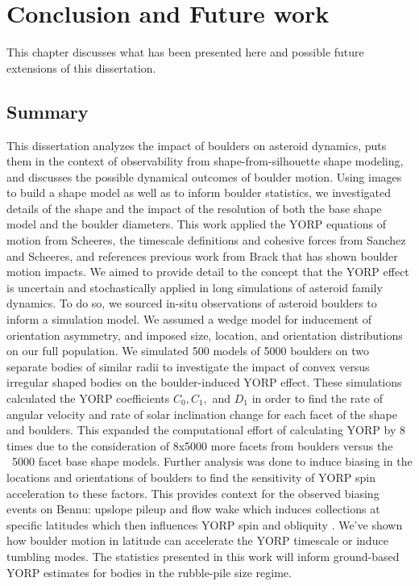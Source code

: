 \chapter{Conclusion and Future work}
\label{future_work}
This chapter discusses what has been presented here and possible future extensions of this dissertation.

\section{Summary}
This dissertation analyzes the impact of boulders on asteroid dynamics, puts them in the context of observability from shape-from-silhouette shape modeling, and discusses the possible dynamical outcomes of boulder motion. Using images to build a shape model as well as to inform boulder statistics, we investigated details of the shape and the impact of the resolution of both the base shape model and the boulder diameters. This work applied the YORP equations of motion from Scheeres, the timescale definitions and cohesive forces from Sanchez and Scheeres, and references previous work from Brack that has shown boulder motion impacts. We aimed to provide detail to the concept that the YORP effect is uncertain and stochastically applied in long simulations of asteroid family dynamics. To do so, we sourced in-situ observations of asteroid boulders to inform a simulation model. We assumed a wedge model for inducement of orientation asymmetry, and imposed size, location, and orientation distributions on our full population. We simulated 500 models of 5000 boulders on two separate bodies of similar radii to investigate the impact of convex versus irregular shaped bodies on the boulder-induced YORP effect. These simulations calculated the YORP coefficients $C_0, C_1,$ and $D_1$ in order to find the rate of angular velocity and rate of solar inclination change for each facet of the shape and boulders. This expanded the computational effort of calculating YORP by 8 times due to the consideration of 8x5000 more facets from boulders versus the ~5000 facet base shape models. 
Further analysis was done to induce biasing in the locations and orientations of boulders to find the sensitivity of YORP spin acceleration to these factors. This provides context for the observed biasing events on Bennu: upslope pileup and flow wake which induces collections at specific latitudes which then influences YORP spin and obliquity \cite{Tang2024}. We've shown how boulder motion in latitude can accelerate the YORP timescale or induce tumbling modes. The statistics presented in this work will inform ground-based YORP estimates for bodies in the rubble-pile size regime.

